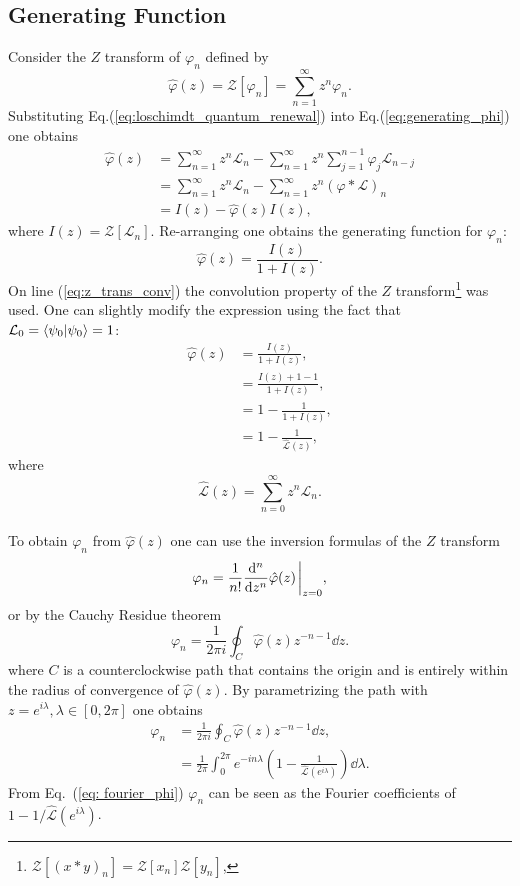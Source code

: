 \documentclass[12pt]{article}
\numberwithin{equation}{section}
\newcommand{\1}{\mathbb{1}}
\newcommand{\zphi}{\hat{\varphi}(z)}
\newcommand{\Lz}{\hat{\mathcal{L}}(z)}
\begin{document}
\subsection{Generating Function}
Consider the $Z$ transform of $\varphi_n$ defined by
\begin{equation}\label{eq:generating_phi}
    \zphi=\mathcal{Z}[\varphi_n]=\sum_{n=1}^\infty z^{n}\varphi_n.
\end{equation}
Substituting Eq.(\ref{eq:loschimdt_quantum_renewal}) into Eq.(\ref{eq:generating_phi}) one obtains 
\begin{align}
\zphi&=\sum_{n=1}^\infty z^{n}\mathcal{L}_n-\sum_{n=1}^{\infty}z^{n}\sum_{j=1}^{n-1}\varphi_j\mathcal{L}_{n-j}
\\
&=\sum_{n=1}^\infty z^{n}\mathcal{L}_n-\sum_{n=1}^{\infty}z^{n}(\varphi * \mathcal{L})_n
\\
&=I(z)-\zphi I(z),  \label{eq:z_trans_conv}
\end{align}
where $I(z)=\mathcal{Z}[\mathcal{L}_n]$.
Re-arranging one obtains the generating function for $\varphi_n$:
\begin{equation}
    \zphi=\frac{I(z)}{1+I(z)}.
\end{equation}
On line (\ref{eq:z_trans_conv}) the convolution property of the $Z$ transform\footnote{ $\mathcal{Z} [(x * y)_n]=\mathcal{Z}[x_n]\mathcal{Z}[y_n]$, } was used. One can slightly modify the expression using the fact that $\mathcal{L}_0=\braket{\psi_0}=1$:
\begin{align}
    \zphi&=\frac{I(z)}{1+I(z)},
    \\
    &=\frac{I(z)+1-1}{1+I(z)},
    \\
    &=1-\frac{1}{1+I(z)},
    \\
    &=1-\frac{1}{\Lz}, 
\end{align}
where
\begin{equation}
\Lz=\sum_{n=0}^{\infty} z^n\mathcal{L}_n. \label{eq:modified_z_loschmidt}
\end{equation}
\\
To obtain $\varphi_n$ from $\zphi$ one can use the inversion formulas of the $Z$ transform
\begin{equation}
    \varphi_n=\frac{1}{n!}\dv[n]{z}\zphi\eval_{z=0},
\end{equation}
or by the Cauchy Residue theorem
\begin{equation}
    \varphi_n=\frac{1}{2\pi i}\oint_C \zphi z^{-n-1} \dd{z}.
\end{equation}
where $C$ is a counterclockwise path that contains the origin and is entirely within the radius of convergence of $\zphi$. By parametrizing the path with $z=e^{i\lambda},\lambda\in[0,2\pi]$ one obtains
\begin{align}
    \varphi_n&=\frac{1}{2\pi i}\oint_C \zphi z^{-n-1} \dd{z},
    \\
    &= \frac{1}{2\pi}\int_0^{2\pi} e^{-in\lambda}\left(1-\frac{1}{\hat{\mathcal{L}}(e^{i\lambda})}\right)\dd \lambda. \label{eq: fourier_phi}
\end{align}
From Eq.~(\ref{eq: fourier_phi}) $\varphi_n$ can be seen as the Fourier coefficients of $1-1/\hat{\mathcal{L}}(e^{i\lambda})$.
\end{document}
